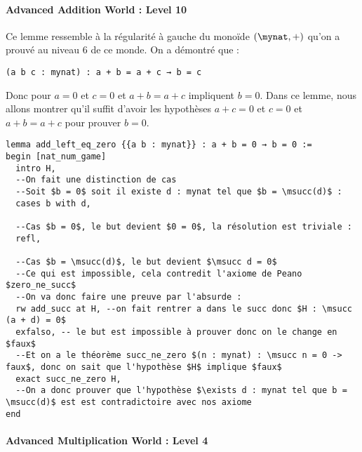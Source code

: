 \paragraph{Advanced Addition World : Level 10}

Ce lemme ressemble à la régularité à gauche du monoïde $(\mynat, +)$ qu'on a prouvé au niveau 6 de ce monde.
On a démontré que :
\begin{verbatim}
(a b c : mynat) : a + b = a + c → b = c
\end{verbatim}
Donc pour $a = 0$ et $c = 0$ et $a + b = a + c$ impliquent $b = 0$.
Dans ce lemme, nous allons montrer qu'il suffit d'avoir les hypothèses $a+c = 0$ et $c = 0$ et $a + b = a + c$ pour prouver $b = 0$.

\begin{verbatim}
lemma add_left_eq_zero {{a b : mynat}} : a + b = 0 → b = 0 :=
begin [nat_num_game]
  intro H,
  --On fait une distinction de cas
  --Soit $b = 0$ soit il existe d : mynat tel que $b = \msucc(d)$ :
  cases b with d,

  --Cas $b = 0$, le but devient $0 = 0$, la résolution est triviale :
  refl,

  --Cas $b = \msucc(d)$, le but devient $\msucc d = 0$
  --Ce qui est impossible, cela contredit l'axiome de Peano $zero_ne_succ$
  --On va donc faire une preuve par l'absurde :
  rw add_succ at H, --on fait rentrer a dans le succ donc $H : \msucc (a + d) = 0$
  exfalso, -- le but est impossible à prouver donc on le change en $faux$
  --Et on a le théorème succ_ne_zero $(n : mynat) : \msucc n = 0 -> faux$, donc on sait que l'hypothèse $H$ implique $faux$
  exact succ_ne_zero H,
  --On a donc prouver que l'hypothèse $\exists d : mynat tel que b = \msucc(d)$ est est contradictoire avec nos axiome
end
\end{verbatim}

\paragraph{Advanced Multiplication World : Level 4}


